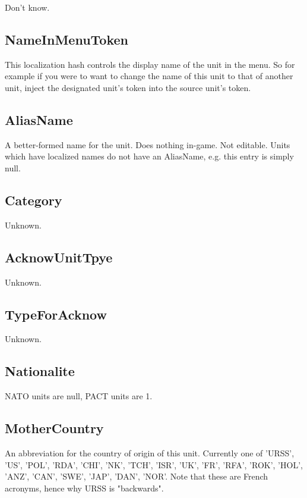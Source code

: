 \documentclass{article}
\begin{document}
Don't know.

\subsection{NameInMenuToken}

This localization hash controls the display name of the unit in the menu. So for example if you were to want to change the name of this unit to that of another unit, inject the designated unit's token into the source unit's token.

\subsection{AliasName}

A better-formed name for the unit. Does nothing in-game. Not editable. Units which have localized names do not have an AliasName, e.g. this entry is simply null.

\subsection{Category}

Unknown.

\subsection{AcknowUnitTpye}

Unknown.

\subsection{TypeForAcknow}

Unknown.

\subsection{Nationalite}

NATO units are null, PACT units are 1.

\subsection{MotherCountry}

An abbreviation for the country of origin of this unit. Currently one of 'URSS', 'US', 'POL', 'RDA', 'CHI', 'NK', 'TCH', 'ISR', 'UK', 'FR', 'RFA', 'ROK', 'HOL', 'ANZ', 'CAN', 'SWE', 'JAP', 'DAN', 'NOR'. Note that these are French acronyms, hence why URSS is "backwards".
\end{document}
